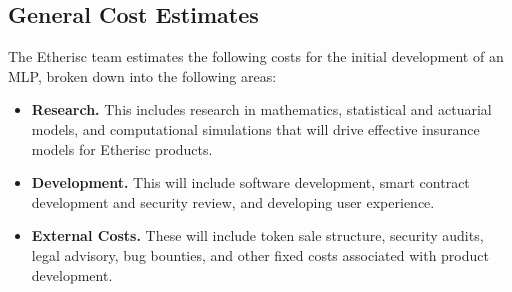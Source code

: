 \documentclass[12pt]{article}
\begin{document}
\subsection{General Cost Estimates}

The Etherisc team estimates the following costs for the initial development of an MLP, broken down into the following areas:

\begin{itemize}
    \item \textbf{Research.} This includes research in mathematics, statistical and actuarial models, and computational simulations that will drive effective insurance models for Etherisc products.

    \item \textbf{Development.} This will include software development, smart contract development and security review, and developing user experience.

    \item \textbf{External Costs.} These will include token sale structure, security audits, legal advisory, bug bounties, and other fixed costs associated with product development.
\end{itemize}
\end{document}
